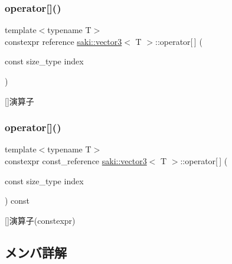 \subsubsection{\texorpdfstring{operator[]()}{operator[]()}\hspace{0.1cm}{\footnotesize\ttfamily [1/2]}}
{\footnotesize\ttfamily template$<$typename T$>$ \\
constexpr reference \mbox{\hyperlink{classsaki_1_1vector3}{saki\+::vector3}}$<$ T $>$\+::operator\mbox{[}$\,$\mbox{]} (\begin{DoxyParamCaption}\item[{const size\+\_\+type}]{index }\end{DoxyParamCaption})\hspace{0.3cm}{\ttfamily [inline]}}



\mbox{[}\mbox{]}演算子 

\mbox{\label{classsaki_1_1vector3_a540ef290a40ceb4023b1f5153eee7da6}} 
\subsubsection{\texorpdfstring{operator[]()}{operator[]()}\hspace{0.1cm}{\footnotesize\ttfamily [2/2]}}
{\footnotesize\ttfamily template$<$typename T$>$ \\
constexpr const\+\_\+reference \mbox{\hyperlink{classsaki_1_1vector3}{saki\+::vector3}}$<$ T $>$\+::operator\mbox{[}$\,$\mbox{]} (\begin{DoxyParamCaption}\item[{const size\+\_\+type}]{index }\end{DoxyParamCaption}) const\hspace{0.3cm}{\ttfamily [inline]}}



\mbox{[}\mbox{]}演算子(constexpr) 



\subsection{メンバ詳解}
\mbox{\label{classsaki_1_1vector3_af3c83fc9c183501a5cfd42f33cac21df}} 
